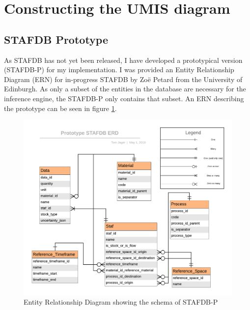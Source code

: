 \documentclass[ %
                    author={Tom Jager},
                supervisor={Dr. Daniel Schien},
                    degree={MEng},
                     title={A Bayesian Inference Engine for UMIS Structured Data},
                  subtitle={},
                      type={research},
                      year={2019} ]{dissertation}
\begin{document}
\section{Constructing the UMIS diagram}

\subsection{STAFDB Prototype}
\label{sec:prototype_stafdb}
As STAFDB has not yet been released, I have developed a prototypical version (STAFDB-P) for my implementation. I was provided an Entity Relationship Diagram (ERN) for in-progress STAFDB by Zo\"e Petard from the University of Edinburgh. As only a subset of the entities in the database are necessary for the inference engine, the STAFDB-P only contains that subset. An ERN describing the prototype can be seen in figure \ref{fig:prototype_ern}.

\begin{figure}
    \centering
    \includegraphics{images/Prototype_STAFDB_ERD.png}
    \caption{Entity Relationship Diagram showing the schema of STAFDB-P}
    \label{fig:prototype_ern}
\end{figure}
\end{document}
